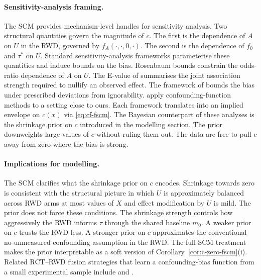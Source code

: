 \paragraph{Sensitivity-analysis framing.}
The SCM provides mechanism-level handles for sensitivity analysis.
Two structural quantities govern the magnitude of $c$.
The first is the dependence of $A$ on $U$ in the RWD, governed by $f_A(\cdot, \cdot, 0, \cdot)$.
The second is the dependence of $f_0$ and $\tau^*$ on $U$.
Standard sensitivity-analysis frameworks parameterise these quantities and induce bounds on the bias.
Rosenbaum bounds \citep{rosenbaum2002observational} constrain the odds-ratio dependence of $A$ on $U$.
The E-value of \citet{vanderweele2017evalue} summarises the joint association strength required to nullify an observed effect.
The framework of \citet{robins2000sensitivity} bounds the bias under prescribed deviations from ignorability.
\citet{YangLiuZengWang2025} apply confounding-function methods to a setting close to ours.
Each framework translates into an implied envelope on $c(x)$ via \eqref{eq:cf-fscm}.
The Bayesian counterpart of these analyses is the shrinkage prior on $c$ introduced in the modelling section.
The prior downweights large values of $c$ without ruling them out.
The data are free to pull $c$ away from zero where the bias is strong.

\paragraph{Implications for modelling.}
The SCM clarifies what the shrinkage prior on $c$ encodes.
Shrinkage towards zero is consistent with the structural picture in which $U$ is approximately balanced across RWD arms at most values of $X$ and effect modification by $U$ is mild.
The prior does not force these conditions.
The shrinkage strength controls how aggressively the RWD informs $\tau$ through the shared baseline $m_0$.
A weaker prior on $c$ trusts the RWD less.
A stronger prior on $c$ approximates the conventional no-unmeasured-confounding assumption in the RWD.
The full SCM treatment makes the prior interpretable as a soft version of Corollary~\ref{cor:c-zero-fscm}(i).
Related RCT--RWD fusion strategies that learn a confounding-bias function from a small experimental sample include \citet{Kallus2018} and \citet{YangLiuZengWang2025}.
